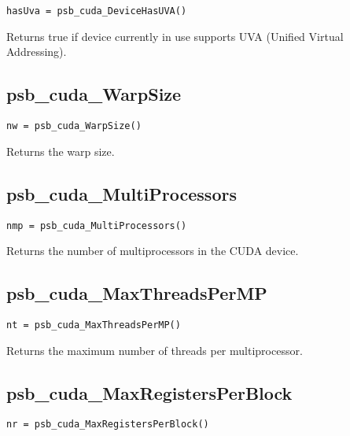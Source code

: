 \begin{verbatim}
hasUva = psb_cuda_DeviceHasUVA()
\end{verbatim}

Returns true if device currently in use supports UVA (Unified Virtual Addressing).

\subsection*{psb\_cuda\_WarpSize }

\begin{verbatim}
nw = psb_cuda_WarpSize()
\end{verbatim}

Returns the warp size.


\subsection*{psb\_cuda\_MultiProcessors }

\begin{verbatim}
nmp = psb_cuda_MultiProcessors()
\end{verbatim}

Returns the number of multiprocessors in the CUDA device.

\subsection*{psb\_cuda\_MaxThreadsPerMP }

\begin{verbatim}
nt = psb_cuda_MaxThreadsPerMP()
\end{verbatim}

Returns the maximum number of threads per multiprocessor. 


\subsection*{psb\_cuda\_MaxRegistersPerBlock }

\begin{verbatim}
nr = psb_cuda_MaxRegistersPerBlock()
\end{verbatim}

